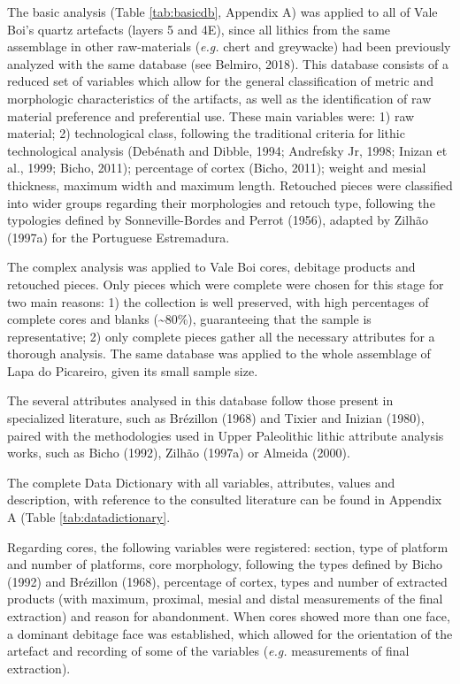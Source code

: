 \documentclass[12pt,twoside]{reedthesis}
\begin{document}
The basic analysis (Table \ref{tab:basicdb}, Appendix A) was applied to all of Vale Boi's quartz artefacts (layers 5 and 4E), since all lithics from the same assemblage in other raw-materials (\emph{e.g.} chert and greywacke) had been previously analyzed with the same database (see Belmiro, 2018). This database consists of a reduced set of variables which allow for the general classification of metric and morphologic characteristics of the artifacts, as well as the identification of raw material preference and preferential use. These main variables were: 1) raw material; 2) technological class, following the traditional criteria for lithic technological analysis (Debénath and Dibble, 1994; Andrefsky Jr, 1998; Inizan et al., 1999; Bicho, 2011); percentage of cortex (Bicho, 2011); weight and mesial thickness, maximum width and maximum length. Retouched pieces were classified into wider groups regarding their morphologies and retouch type, following the typologies defined by Sonneville-Bordes and Perrot (1956), adapted by Zilhão (1997a) for the Portuguese Estremadura.

The complex analysis was applied to Vale Boi cores, debitage products and retouched pieces. Only pieces which were complete were chosen for this stage for two main reasons: 1) the collection is well preserved, with high percentages of complete cores and blanks (\textasciitilde80\%), guaranteeing that the sample is representative; 2) only complete pieces gather all the necessary attributes for a thorough analysis. The same database was applied to the whole assemblage of Lapa do Picareiro, given its small sample size.

The several attributes analysed in this database follow those present in specialized literature, such as Brézillon (1968) and Tixier and Inizian (1980), paired with the methodologies used in Upper Paleolithic lithic attribute analysis works, such as Bicho (1992), Zilhão (1997a) or Almeida (2000).

The complete Data Dictionary with all variables, attributes, values and description, with reference to the consulted literature can be found in Appendix A (Table \ref{tab:datadictionary}.

Regarding cores, the following variables were registered: section, type of platform and number of platforms, core morphology, following the types defined by Bicho (1992) and Brézillon (1968), percentage of cortex, types and number of extracted products (with maximum, proximal, mesial and distal measurements of the final extraction) and reason for abandonment. When cores showed more than one face, a dominant debitage face was established, which allowed for the orientation of the artefact and recording of some of the variables (\emph{e.g.} measurements of final extraction).
\end{document}
